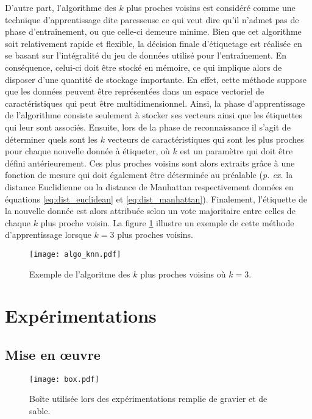 D'autre part, l'algorithme des $k$ plus proches voisins est considéré comme une technique d'apprentissage dite \og{}paresseuse\fg{} ce qui veut dire qu'il n'admet pas de phase d'entraînement, ou que celle-ci demeure minime. Bien que cet algorithme soit relativement rapide et flexible, la décision finale d'étiquetage est réalisée en se basant sur l'intégralité du jeu de données utilisé pour l'entraînement. En conséquence, celui-ci doit être stocké en mémoire, ce qui implique alors de disposer d'une quantité de stockage importante. En effet, cette méthode suppose que les données peuvent être représentées dans un espace vectoriel de caractéristiques qui peut être multidimensionnel. Ainsi, la phase d'apprentissage de l'algorithme consiste seulement à stocker ses vecteurs ainsi que les étiquettes qui leur sont associés. Ensuite, lors de la phase de reconnaissance il s'agit de déterminer quels sont les $k$ vecteurs de caractéristiques qui sont les plus proches pour chaque nouvelle donnée à étiqueter, où $k$ est un paramètre qui doit être défini antérieurement. Ces plus proches voisins sont alors extraits grâce à une fonction de mesure qui doit également être déterminée au préalable (\textit{p. ex.} la distance Euclidienne ou la distance de Manhattan respectivement données en équations \ref{eq:dist_euclidean} et \ref{eq:dist_manhattan}). Finalement, l'étiquette de la nouvelle donnée est alors attribuée selon un vote majoritaire entre celles de chaque $k$ plus proche voisin. La figure \ref{fig:algo_knn} illustre un exemple de cette méthode d'apprentissage lorsque $k=3$ plus proches voisins.

\begin{figure}[H]
	\centering
	\texttt{[image: algo\_knn.pdf]}
        \caption{Exemple de l'algoritme des $k$ plus proches voisins où $k=3$.}
	\label{fig:algo_knn}
\end{figure}

\section{Expérimentations}
\label{sec:expe}

\subsection{Mise en \oe{}uvre}

\begin{figure}[H]
	\centering
	\texttt{[image: box.pdf]}
        \caption{Boîte utilisée lors des expérimentations remplie de gravier et de sable.}
	\label{fig:box}
\end{figure}

